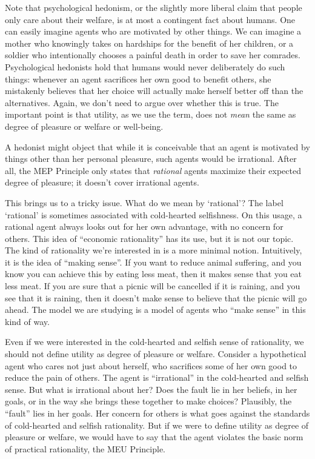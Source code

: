 Note that psychological hedonism, or the slightly more liberal claim that people
only care about their welfare, is at most a contingent fact about humans. One
can easily imagine agents who are motivated by other things. We can imagine a
mother who knowingly takes on hardships for the benefit of her children, or a
soldier who intentionally chooses a painful death in order to save her comrades.
Psychological hedonists hold that humans would never deliberately do such things:
whenever an agent sacrifices her own good to benefit others, she mistakenly
believes that her choice will actually make herself better off than the
alternatives. Again, we don't need to argue over whether this is true. The
important point is that utility, as we use the term, does not \emph{mean} the
same as degree of pleasure or welfare or well-being.


A hedonist might object that while it is conceivable that an agent is motivated
by things other than her personal pleasure, such agents would be irrational.
After all, the MEP Principle only states that \emph{rational} agents maximize
their expected degree of pleasure; it doesn't cover irrational agents.

This brings us to a tricky issue. What do we mean by `rational'? The label
`rational' is sometimes associated with cold-hearted selfishness. On this usage,
a rational agent always looks out for her own advantage, with no concern for
others. This idea of ``economic rationality'' has its use, but it is not our
topic. The kind of rationality we're interested in is a more minimal notion.
Intuitively, it is the idea of ``making sense''. If you want to reduce animal
suffering, and you know you can achieve this by eating less meat, then it makes
sense that you eat less meat. If you are sure that a picnic will be cancelled if
it is raining, and you see that it is raining, then it doesn't make sense to
believe that the picnic will go ahead. The model we are studying is a model of
agents who ``make sense'' in this kind of way.

Even if we were interested in the cold-hearted and selfish sense of rationality,
we should not define utility as degree of pleasure or welfare. Consider a
hypothetical agent who cares not just about herself, who sacrifices some of her
own good to reduce the pain of others. The agent is ``irrational'' in the
cold-hearted and selfish sense. But what is irrational about her? Does the fault
lie in her beliefs, in her goals, or in the way she brings these together to
make choices? Plausibly, the ``fault'' lies in her goals. Her concern for others
is what goes against the standards of cold-hearted and selfish rationality. But
if we were to define utility as degree of pleasure or welfare, we would have to
say that the agent violates the basic norm of practical rationality, the MEU
Principle.

